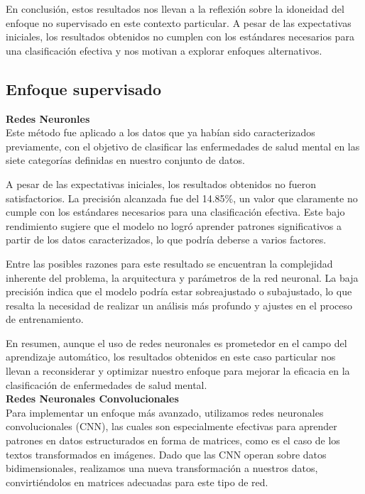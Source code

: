 \documentclass[
10pt, %
a4paper, %
oneside, %
headinclude,footinclude, %
BCOR5mm, %
]{scrartcl}
\begin{document}
En conclusión, estos resultados nos llevan a la reflexión sobre la idoneidad del enfoque no supervisado en este contexto particular. A pesar de las expectativas iniciales, los resultados obtenidos no cumplen con los estándares necesarios para 
una clasificación efectiva y nos motivan a explorar enfoques alternativos.

\subsection{Enfoque supervisado}

\textbf{Redes Neuronles}\\

Este método fue aplicado a los datos que ya habían sido caracterizados previamente, con el objetivo de clasificar las enfermedades de salud mental en las siete categorías definidas en nuestro conjunto de datos.

A pesar de las expectativas iniciales, los resultados obtenidos no fueron satisfactorios. La precisión alcanzada fue del 14.85\%, un valor que claramente no cumple con los estándares necesarios para una clasificación efectiva. 
Este bajo rendimiento sugiere que el modelo no logró aprender patrones significativos a partir de los datos caracterizados, lo que podría deberse a varios factores.

Entre las posibles razones para este resultado se encuentran la complejidad inherente del problema, la arquitectura y parámetros de la red neuronal. La baja precisión indica que el modelo podría estar sobreajustado o subajustado, 
lo que resalta la necesidad de realizar un análisis más profundo y ajustes en el proceso de entrenamiento.

En resumen, aunque el uso de redes neuronales es prometedor en el campo del aprendizaje automático, los resultados obtenidos en este caso particular nos llevan a reconsiderar y optimizar nuestro enfoque para mejorar la eficacia en la clasificación de enfermedades de salud mental.\\


\textbf{Redes Neuronales Convolucionales}\\

Para implementar un enfoque más avanzado, utilizamos redes neuronales convolucionales (CNN), las cuales son especialmente efectivas para aprender patrones en datos estructurados en forma de matrices, 
como es el caso de los textos transformados en imágenes. Dado que las CNN operan sobre datos bidimensionales, realizamos una nueva transformación a nuestros datos, convirtiéndolos en matrices adecuadas 
para este tipo de red.
\end{document}
